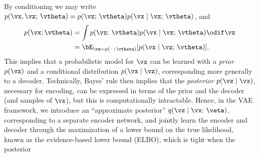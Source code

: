 \documentclass[../../book-main.tex]{subfiles}
\begin{document}
By conditioning we may write $p(\vx, \vz ;\, \vtheta)
= p(\vz;\, \vtheta) p(\vx \mid \vz;\, \vtheta)$, and
\begin{align*}
p(\vx; \vtheta) &= \int p(\vz;\, \vtheta) p(\vx \mid \vz;\, \vtheta) \odif \vz
\\
&=
\bE_{\vz \sim p(\,\cdot\,;\, \vtheta)}[ p(\vx \mid \vz;\, \vtheta) ].
\end{align*}
%
This implies that a probabilistic model for $\vx$ can be learned with
a \textit{prior} $p(\vz)$ and a conditional distribution $p(\vx \mid \vz)$,
corresponding more generally to a decoder.
Technically, Bayes' rule then implies that the \textit{posterior} $p(\vz \mid
\vx)$, necessary for encoding, can be expressed in terms of the prior and the
decoder (and samples of $\vx$), but this is computationally intractable. Hence,
in the VAE framework, we introduce an ``approximate posterior'' $q(\vz \mid \vx;\, \veta)$, corresponding
to a separate encoder network, and jointly learn the encoder and decoder through
the maximization of a lower bound on the true likelihood, known as the
evidence-based lower bound (ELBO), which is tight when the posterior
\end{document}
